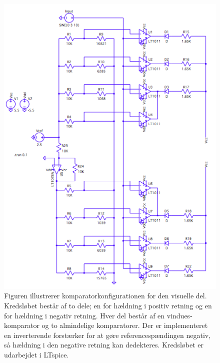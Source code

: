 \begin{figure}[H]
	\centering
	\includegraphics[scale=0.7]{figures/cProblemloesning/komparator_visuel1.PNG}
	\caption{Figuren illustrerer komparatorkonfigurationen for den visuelle del. Kredsløbet består af to dele; en for hældning i positiv retning og en for hældning i negativ retning. Hver del består af en vindues-komparator og to almindelige komparatorer. Der er implementeret en inverterende forstærker for at gøre referencespændingen negativ, så hældning i den negative retning kan dedekteres. Kredsløbet er udarbejdet i LTspice.}
	\label{fig:komparator_visuel}
\end{figure}


